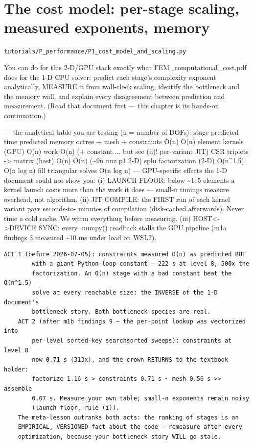 \chapter{The cost model: per-stage scaling, measured exponents, memory}
\label{ch:P1_cost_model_and_scaling}
\noindent\texttt{tutorials/P\_performance/P1\_cost\_model\_and\_scaling.py}\\[0.75em]
\begin{outcome}
You can do for this 2-D/GPU stack exactly what
FEM\_computational\_cost.pdf does for the 1-D CPU solver: predict each
stage's complexity exponent analytically, MEASURE it from wall-clock
scaling, identify the bottleneck and the memory wall, and explain every
disagreement between prediction and measurement. (Read that document
first — this chapter is its hands-on continuation.)
\end{outcome}

— the analytical table you are testing (n = number of DOFs):
    stage                          predicted time     predicted memory
    octree + mesh + constraints    O(n)               O(n)
    element kernels (GPU)          O(n) work          O(n) (+ constant
                                   ... but see (ii)!    per-variant JIT)
    CSR triplets -> matrix (host)  O(n)               O(n) (\textasciitilde{}9n nnz p1 2-D)
    splu factorization (2-D)       O(n\textasciicircum{}1.5)           O(n log n) fill
    triangular solves              O(n log n)         —
GPU-specific effects the 1-D document could not show you:
  (i) LAUNCH FLOOR: below \textasciitilde{}1e5 elements a kernel launch costs more than
      the work it does — small-n timings measure overhead, not algorithm.
 (ii) JIT COMPILE: the FIRST run of each kernel variant pays seconds-to-
      minutes of compilation (disk-cached afterwards). Never time a cold
      cache. We warm everything before measuring.
(iii) HOST<->DEVICE SYNC: every .numpy() readback stalls the GPU pipeline
      (m1a findings 3 measured \textasciitilde{}10 ms under load on WSL2).

\begin{expected}
\begin{verbatim}
ACT 1 (before 2026-07-05): constraints measured O(n) as predicted BUT
        with a giant Python-loop constant — 222 s at level 8, 500x the
        factorization. An O(n) stage with a bad constant beat the O(n^1.5)
        solve at every reachable size: the INVERSE of the 1-D document's
        bottleneck story. Both bottleneck species are real.
    ACT 2 (after m1b findings 9 — the per-point lookup was vectorized into
        per-level sorted-key searchsorted sweeps): constraints at level 8
        now 0.71 s (313x), and the crown RETURNS to the textbook holder:
        factorize 1.16 s > constraints 0.71 s ~ mesh 0.56 s >> assemble
        0.07 s. Measure your own table; small-n exponents remain noisy
        (launch floor, rule (i)).
    The meta-lesson outranks both acts: the ranking of stages is an
    EMPIRICAL, VERSIONED fact about the code — remeasure after every
    optimization, because your bottleneck story WILL go stale.
\end{verbatim}
\end{expected}

